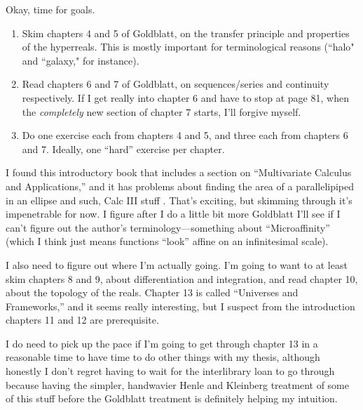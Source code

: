\documentclass{article}
\begin{document}
Okay, time for goals. \begin{enumerate}
    \item Skim chapters 4 and 5 of Goldblatt, on the transfer principle and properties of the hyperreals. This is mostly important for terminological reasons (``halo" and ``galaxy," for instance). 
    \item Read chapters 6 and 7 of Goldblatt, on sequences/series and continuity respectively. If I get really into chapter 6 and have to stop at page 81, when the \textit{completely} new section of chapter 7 starts, I'll forgive myself.
    \item Do one exercise each from chapters 4 and 5, and three each from chapters 6 and 7. Ideally, one ``hard'' exercise per chapter.
\end{enumerate}

I found this introductory book that includes a section on ``Multivariate Calculus and Applications,'' and it has problems about finding the area of a parallelipiped in an ellipse and such, Calc III stuff \cite{bell2008}. That's exciting, but skimming through it's impenetrable for now. I figure after I do a little bit more Goldblatt I'll see if I can't figure out the author's terminology---something about ``Microaffinity'' (which I think just means functions ``look'' affine on an infinitesimal scale).

I also need to figure out where I'm actually going. I'm going to want to at least skim chapters 8 and 9, about differentiation and integration, and read chapter 10, about the topology of the reals. Chapter 13 is called ``Universes and Frameworks,'' and it seems really interesting, but I suspect from the introduction chapters 11 and 12 are prerequisite. 

I do need to pick up the pace if I'm going to get through chapter 13 in a reasonable time to have time to do other things with my thesis, although honestly I don't regret having to wait for the interlibrary loan to go through because having the simpler, handwavier Henle and Kleinberg treatment of some of this stuff before the Goldblatt treatment is definitely helping my intuition. 

\nocite{palmgren1998}

\printbibliography[title={Things I'm Looking At, If Only Briefly}]
\end{document}
